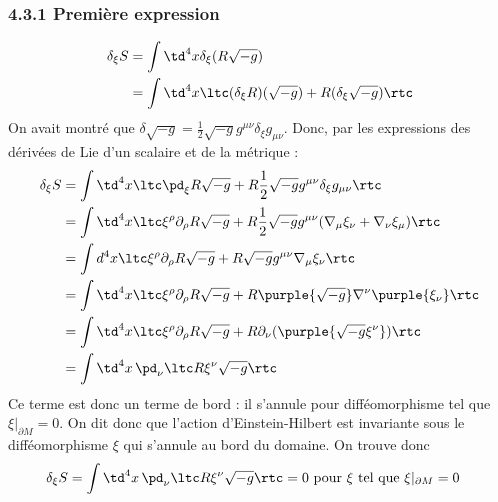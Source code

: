 \subsubsection{4.3.1 Première expression}
\begin{align}
    \delta_{\xi}S &= \int \td ^4x \delta_{\xi}(R\sqrt{-g})\\
    &=  \int \td ^4x \ltc (\delta_{\xi}R)(\sqrt{-g}) + R(\delta_{\xi}\sqrt{-g}) \rtc
\end{align}
On avait montré que $\delta \sqrt{-g} = \frac{1}{2}\sqrt{-g}g^{\mu \nu}\delta_{\xi} g_{\mu \nu}$. Donc, par les expressions des dérivées de Lie d'un scalaire et de la métrique :
\begin{align}
     \delta_{\xi}S &=\int \td ^4x \ltc\pd_{\xi}R\sqrt{-g} + R\frac{1}{2}\sqrt{-g}g^{\mu \nu}\delta_\xi g_{\mu \nu}\rtc\\
     &= \int \td ^4x \ltc\xi^{\rho}\partial_{\rho}R\sqrt{-g} + R\frac{1}{2}\sqrt{-g}g^{\mu \nu} (\nabla_{\mu}\xi_{\nu} + \nabla_{\nu}\xi_{\mu})\rtc\\
     &= \int d^4x\ltc\xi^{\rho}\partial_{\rho}R\sqrt{-g} + R\sqrt{-g}g^{\mu \nu} \nabla_{\mu}\xi_{\nu}\rtc\\
     &= \int \td ^4x \ltc\xi^{\rho}\partial_{\rho}R\sqrt{-g} + R\purple{\sqrt{-g}}\nabla^{\nu}\purple{\xi_{\nu}}\rtc\\
     &=\int \td ^4x \ltc\xi^{\rho}\partial_{\rho}R\sqrt{-g} + R \partial_{\nu}(\purple{\sqrt{-g}\xi^{\nu}})\rtc\\
     &=\int \td ^4x \, \pd_\nu \ltc R\xi^{\nu}\sqrt{-g} \rtc
\end{align}
Ce terme est donc un terme de bord : il s'annule pour difféomorphisme tel que $\xi|_{\partial M} = 0$. On dit donc que l'action d'Einstein-Hilbert est invariante sous le difféomorphisme $\xi$ qui s'annule au bord du domaine. On trouve donc 
\begin{align}
    \delta_{\xi}S &=\int \td ^4x \, \pd_\nu \ltc R\xi^{\nu}\sqrt{-g} \rtc = 0 \text{ pour } \xi \text{ tel que } \xi |_{\partial M} = 0
\end{align}
